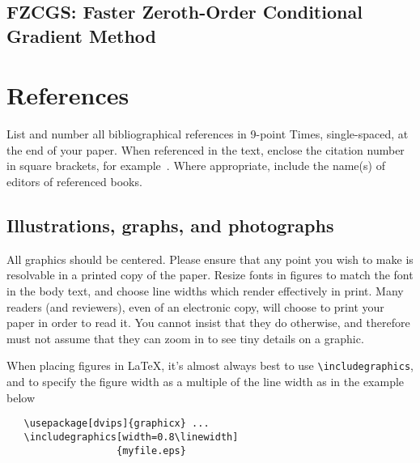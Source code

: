 \documentclass[10pt,twocolumn,letterpaper]{article}
\begin{document}
\subsection{FZCGS: Faster Zeroth-Order Conditional Gradient Method}

\section{References}

List and number all bibliographical references in 9-point Times,
single-spaced, at the end of your paper. When referenced in the text,
enclose the citation number in square brackets, for
example~\cite{Authors14}.  Where appropriate, include the name(s) of
editors of referenced books.



\subsection{Illustrations, graphs, and photographs}

All graphics should be centered.  Please ensure that any point you wish to
make is resolvable in a printed copy of the paper.  Resize fonts in figures
to match the font in the body text, and choose line widths which render
effectively in print.  Many readers (and reviewers), even of an electronic
copy, will choose to print your paper in order to read it.  You cannot
insist that they do otherwise, and therefore must not assume that they can
zoom in to see tiny details on a graphic.

When placing figures in \LaTeX, it's almost always best to use
\verb+\includegraphics+, and to specify the  figure width as a multiple of
the line width as in the example below
{\small\begin{verbatim}
   \usepackage[dvips]{graphicx} ...
   \includegraphics[width=0.8\linewidth]
                   {myfile.eps}
\end{verbatim}
}


{\small


}
\end{document}
